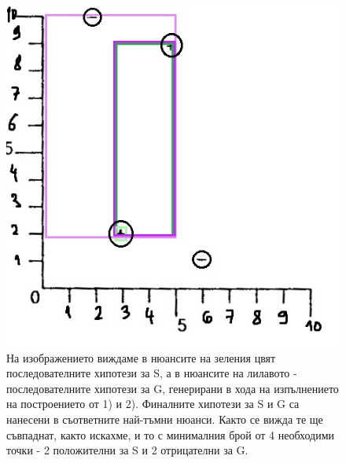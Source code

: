 \documentclass[12pt]{article}
\begin{document}
	\newpage
	\begin{figure}[H]
		\centering
		\includegraphics[width=150mm]{Untitled2.jpg} 
		\caption{На изображението виждаме в нюансите на зеления цвят последователните хипотези за S, а в нюансите на лилавото - последователните хипотези за G, генерирани в хода на изпълнението на построението от 1) и 2). Финалните хипотези за S и G са нанесени в съответните най-тъмни нюанси. Както се вижда те ще съвпаднат, както искахме, и то с минималния брой от 4 необходими точки - 2 положителни за S и 2 отрицателни за G.}
	\end{figure}
	
	
	
	
\end{document}
